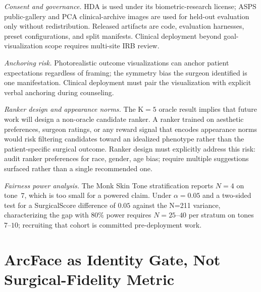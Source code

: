 \documentclass{article}
\begin{document}
\textit{Consent and governance.} HDA is used under its biometric-research
license; ASPS public-gallery and PCA clinical-archive images are used for
held-out evaluation only without redistribution. Released artifacts are
code, evaluation harnesses, preset configurations, and split manifests.
Clinical deployment beyond goal-visualization scope requires multi-site
IRB review.

\textit{Anchoring risk.} Photorealistic outcome visualizations can anchor
patient expectations regardless of framing; the symmetry bias the surgeon
identified is one manifestation. Clinical deployment must pair the
visualization with explicit verbal anchoring during counseling.

\textit{Ranker design and appearance norms.} The K$=5$ oracle result
implies that future work will design a non-oracle candidate ranker. A
ranker trained on aesthetic preferences, surgeon ratings, or any reward
signal that encodes appearance norms would risk filtering candidates
toward an idealized phenotype rather than the patient-specific surgical
outcome. Ranker design must explicitly address this risk: audit ranker
preferences for race, gender, age bias; require multiple suggestions
surfaced rather than a single recommended one.

\textit{Fairness power analysis.} The Monk Skin Tone stratification
reports $N{=}4$ on tone~$7$, which is too small for a powered claim.
Under $\alpha{=}0.05$ and a two-sided test for a SurgicalScore difference
of $0.05$ against the N=211 variance, characterizing the gap with
$80\%$ power requires $N{=}25$--$40$ per stratum on tones $7$--$10$;
recruiting that cohort is committed pre-deployment work.

\section{ArcFace as Identity Gate, Not Surgical-Fidelity Metric}
\label{app:arcface_gate}
\end{document}
